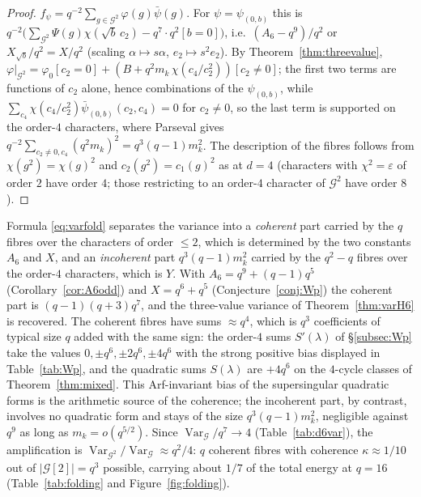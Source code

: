 \documentclass[11pt,a4paper]{amsart}
\theoremstyle{definition}
\newcommand{\G}{\mathcal{G}}
\newcommand{\Var}{\operatorname{Var}}
\newcommand{\eps}{\varepsilon}
\begin{document}
\begin{proof}
$f_\psi=q^{-2}\sum_{g\in\G^2}\varphi(g)\bar\psi(g)$. For $\psi=\psi_{(0,b)}$ this is $q^{-2}\bigl(\sum_{\G^2}\Psi(g)\chi(\sqrt b\,c_2)-q^7\cdot q^2[b=0]\bigr)$, i.e.\ $(A_6-q^9)/q^2$ or $X_{\sqrt b}/q^2=X/q^2$ (scaling $\alpha\mapsto s\alpha$, $e_2\mapsto s^2e_2$). By Theorem~\ref{thm:threevalue}, $\varphi|_{\G^2}=\varphi_0[c_2=0]+(B+q^2m_k\,\chi(c_4/c_2^2))[c_2\ne0]$; the first two terms are functions of $c_2$ alone, hence combinations of the $\psi_{(0,b)}$, while $\sum_{c_4}\chi(c_4/c_2^2)\bar\psi_{(0,b)}(c_2,c_4)=0$ for $c_2\ne0$, so the last term is supported on the order-$4$ characters, where Parseval gives $q^{-2}\sum_{c_2\ne0,c_4}(q^2m_k)^2=q^3(q-1)m_k^2$. The description of the fibres follows from $\chi(g^2)=\chi(g)^2$ and $c_2(g^2)=c_1(g)^2$ as at $d=4$ (characters with $\chi^2=\eps$ of order $2$ have order $4$; those restricting to an order-$4$ character of $\G^2$ have order $8$).
\end{proof}

Formula \eqref{eq:varfold} separates the variance into a \emph{coherent} part carried by the $q$ fibres over the characters of order $\le2$, which is determined by the two constants $A_6$ and $X$, and an \emph{incoherent} part $q^3(q-1)m_k^2$ carried by the $q^2-q$ fibres over the order-$4$ characters, which is $Y$. With $A_6=q^9+(q-1)q^5$ (Corollary~\ref{cor:A6odd}) and $X=q^6+q^5$ (Conjecture~\ref{conj:Wp}) the coherent part is $(q-1)(q+3)q^7$, and the three-value variance of Theorem~\ref{thm:varH6} is recovered. The coherent fibres have sums $\approx q^4$, which is $q^3$ coefficients of typical size $q$ added with the same sign: the order-$4$ sums $S'(\lambda)$ of \S\ref{subsec:Wp} take the values $0,\pm q^6,\pm2q^6,\pm4q^6$ with the strong positive bias displayed in Table~\ref{tab:Wp}, and the quadratic sums $S(\lambda)$ are $+4q^6$ on the $4$-cycle classes of Theorem~\ref{thm:mixed}. This Arf-invariant bias of the supersingular quadratic forms is the arithmetic source of the coherence; the incoherent part, by contrast, involves no quadratic form and stays of the size $q^3(q-1)m_k^2$, negligible against $q^9$ as long as $m_k=o(q^{5/2})$. Since $\Var_\G/q^7\to4$ (Table~\ref{tab:d6var}), the amplification is $\Var_{\G^2}/\Var_\G\approx q^2/4$: $q$ coherent fibres with coherence $\kappa\approx1/10$ out of $|\G[2]|=q^3$ possible, carrying about $1/7$ of the total energy at $q=16$ (Table~\ref{tab:folding} and Figure~\ref{fig:folding}).
\end{document}
